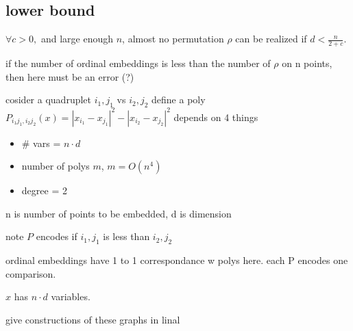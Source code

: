\documentclass{article}
\theoremstyle{definition}
\newcommand{\abs}[1]{\left| #1 \right|}
\begin{document}
\subsection{lower bound}

\(\forall c>0,\) and large enough \(n\), almost no permutation \(\rho\) can be realized if \(d<\frac{n}{2+c}\).


if the number of ordinal embeddings is less than the number of \(\rho\) on n points, then here must be an error (?)


cosider a quadruplet \(i_1,j_1\) vs \(i_2,j_2\) 
define a poly \(P_{i_1j_1,i_2j_2}(x)= \abs{x_{i_1}-x_{j_1}}^2-\abs{x_{i_2}-x_{j_2}}^2\) 
depends on 4 things
\begin{itemize}
    \item \# vars = \(n\cdot d\)
    \item number of polys \(m\), \(m=O(n^4)\)
    \item degree = 2
\end{itemize}
n is number of points to be embedded, d is dimension

note \(P\) encodes if \(i_1,j_1\) is less than \(i_2,j_2\)

ordinal embeddings have 1 to 1 correspondance w polys here. each P encodes one comparison.

\(x\) has \(n\cdot d\) variables.

give constructions of these graphs in linal
\end{document}
